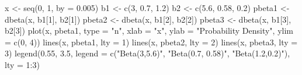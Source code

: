\begin{Schunk}
\begin{Sinput}
 x <- seq(0, 1, by = 0.005)
 b1 <- c(3, 0.7, 1.2)
 b2 <- c(5.6, 0.58, 0.2)
 pbeta1 <- dbeta(x, b1[1], b2[1])
 pbeta2 <- dbeta(x, b1[2], b2[2])
 pbeta3 <- dbeta(x, b1[3], b2[3])
 plot(x, pbeta1, type = "n", xlab = "x", ylab = "Probability Density", ylim = c(0, 
      4))
 lines(x, pbeta1, lty = 1)
 lines(x, pbeta2, lty = 2)
 lines(x, pbeta3, lty = 3)
 legend(0.55, 3.5, legend = c("Beta(3,5.6)", "Beta(0.7, 0.58)", "Beta(1.2,0.2)"), 
      lty = 1:3)
\end{Sinput}
\end{Schunk}
